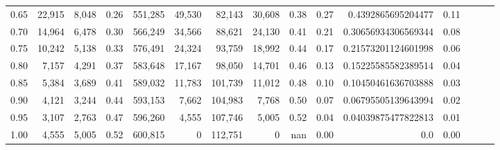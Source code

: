 \begin{tabular}{rrrrrrrrrrrrrrr}
0.65 &  22,915 &   8,048 &  0.26 &  551,285 &   49,530 &   82,143 &   30,608 &  0.38 &  0.27 &   0.4392865695204477 &      0.11 \\
0.70 &  14,964 &   6,478 &  0.30 &  566,249 &   34,566 &   88,621 &   24,130 &  0.41 &  0.21 &  0.30656934306569344 &      0.08 \\
0.75 &  10,242 &   5,138 &  0.33 &  576,491 &   24,324 &   93,759 &   18,992 &  0.44 &  0.17 &  0.21573201124601998 &      0.06 \\
0.80 &   7,157 &   4,291 &  0.37 &  583,648 &   17,167 &   98,050 &   14,701 &  0.46 &  0.13 &  0.15225585582389514 &      0.04 \\
0.85 &   5,384 &   3,689 &  0.41 &  589,032 &   11,783 &  101,739 &   11,012 &  0.48 &  0.10 &  0.10450461636703888 &      0.03 \\
0.90 &   4,121 &   3,244 &  0.44 &  593,153 &    7,662 &  104,983 &    7,768 &  0.50 &  0.07 &  0.06795505139643994 &      0.02 \\
0.95 &   3,107 &   2,763 &  0.47 &  596,260 &    4,555 &  107,746 &    5,005 &  0.52 &  0.04 &  0.04039875477822813 &      0.01 \\
1.00 &   4,555 &   5,005 &  0.52 &  600,815 &        0 &  112,751 &        0 &   nan &  0.00 &                  0.0 &      0.00 \\
\bottomrule
\end{tabular}
